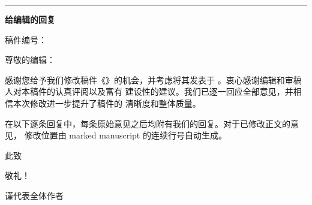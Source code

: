 \documentclass[11pt]{article}
\newcommand{\ManuscriptIDLine}{%
  \if\relax\detokenize\expandafter{\ManuscriptID}\relax
  \else 稿件编号：\ManuscriptID\fi}
\begin{document}
{\color{navy}\rule{\textwidth}{1.5pt}}\par
\vspace{0.15in}
{\sffamily\bfseries\LARGE 给编辑的回复}\par
\vspace{0.08in}
{\color{graytext}\ManuscriptTitle}\par
{\small\color{graytext}\JournalName\quad\ManuscriptIDLine}
\vspace{0.28in}

尊敬的编辑：

感谢您给予我们修改稿件《\ManuscriptTitle》的机会，并考虑将其发表于
\textit{\JournalName}。衷心感谢编辑和审稿人对本稿件的认真评阅以及富有
建设性的建议。我们已逐一回应全部意见，并相信本次修改进一步提升了稿件的
清晰度和整体质量。

在以下逐条回复中，每条原始意见之后均附有我们的回复。对于已修改正文的意见，
修改位置由 marked manuscript 的连续行号自动生成。

此致\par
敬礼！\par
\vspace{0.25in}
\CorrespondenceAuthorNameZh\par
谨代表全体作者\par
\href{mailto:\CorrespondenceAuthorEmail}{\CorrespondenceAuthorEmail}

\end{document}
